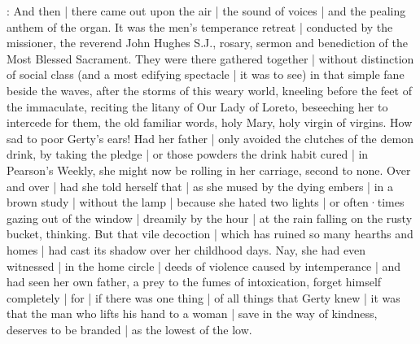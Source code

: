 :
And then |
there came out upon the air |
the sound of voices |
and the pealing anthem of the organ.
It was the men's temperance retreat |
conducted by the missioner,
the reverend John Hughes S.J.,
rosary, sermon and benediction
of the Most Blessed Sacrament.
They were there gathered together |
without distinction of social class
(and a most edifying spectacle |
it was to see)
in that simple fane beside the waves,
after the storms
of this weary world,
kneeling before the feet of the immaculate,
reciting the litany of Our Lady of Loreto,
beseeching her to intercede for them,
the old familiar words,
holy Mary,
holy virgin of virgins.
How sad to poor Gerty's ears!%
Had her father |
only avoided the clutches of the demon drink,
by taking the pledge |
or those powders the drink habit cured |
in Pearson's Weekly,
she might now be rolling in her carriage,
second to none.
Over and over |
had she told herself that |
as she mused by the dying embers |
in a brown study |
without the lamp |
because she hated two lights |
or often·times gazing out of the window |
dreamily by the hour |
at the rain falling on the rusty bucket,
thinking.
But that vile decoction |
which has ruined so many hearths and homes |
had cast its shadow over her childhood days.
Nay,
she had even witnessed |
in the home circle |
deeds of violence
caused by intemperance |
and had seen her own father,
a prey to the fumes of intoxication,
forget himself completely |%
for |
if there was one thing |
of all things
that Gerty knew |
it was
that the man who lifts his hand to a woman |
save in the way of kindness,
deserves to be branded |
as the lowest of the low.


